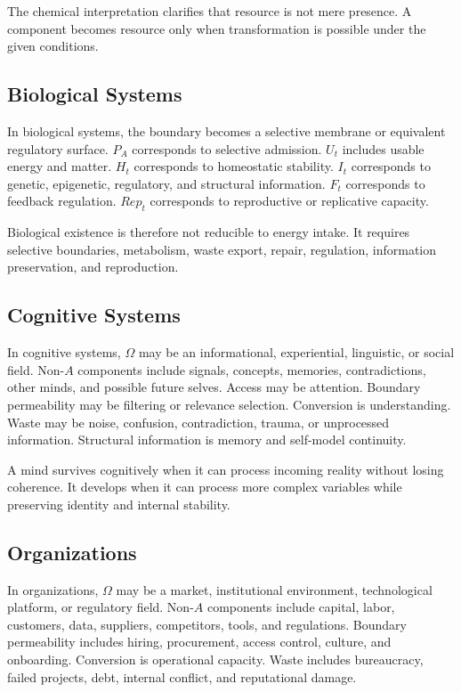 \documentclass[11pt,a4paper]{article}
\begin{document}
The chemical interpretation clarifies that resource is not mere presence. A component becomes resource only when transformation is possible under the given conditions.

\subsection{Biological Systems}

In biological systems, the boundary becomes a selective membrane or equivalent regulatory surface. $P_A$ corresponds to selective admission. $U_t$ includes usable energy and matter. $H_t$ corresponds to homeostatic stability. $I_t$ corresponds to genetic, epigenetic, regulatory, and structural information. $F_t$ corresponds to feedback regulation. $Rep_t$ corresponds to reproductive or replicative capacity.

Biological existence is therefore not reducible to energy intake. It requires selective boundaries, metabolism, waste export, repair, regulation, information preservation, and reproduction.

\subsection{Cognitive Systems}

In cognitive systems, $\Omega$ may be an informational, experiential, linguistic, or social field. Non-$A$ components include signals, concepts, memories, contradictions, other minds, and possible future selves. Access may be attention. Boundary permeability may be filtering or relevance selection. Conversion is understanding. Waste may be noise, confusion, contradiction, trauma, or unprocessed information. Structural information is memory and self-model continuity.

A mind survives cognitively when it can process incoming reality without losing coherence. It develops when it can process more complex variables while preserving identity and internal stability.

\subsection{Organizations}

In organizations, $\Omega$ may be a market, institutional environment, technological platform, or regulatory field. Non-$A$ components include capital, labor, customers, data, suppliers, competitors, tools, and regulations. Boundary permeability includes hiring, procurement, access control, culture, and onboarding. Conversion is operational capacity. Waste includes bureaucracy, failed projects, debt, internal conflict, and reputational damage.
\end{document}
